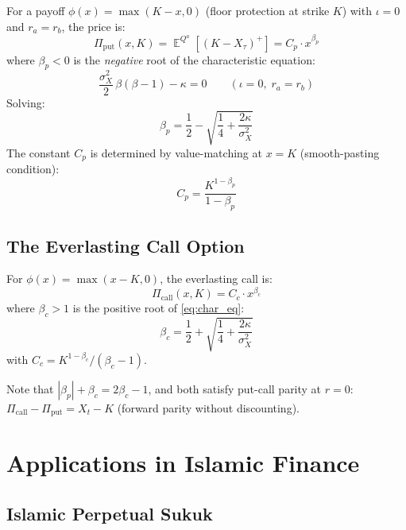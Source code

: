 \documentclass[10pt,twocolumn]{article}
\theoremstyle{plain}
\theoremstyle{definition}
\DeclareMathOperator{\E}{\mathbb{E}}
\newcommand{\Qa}{Q^a}
\begin{document}
For a payoff $\phi(x) = \max(K - x, 0)$ (floor protection at
strike $K$) with $\iota = 0$ and $r_a = r_b$, the price is:
\begin{equation}
\Pi_{\mathrm{put}}(x, K)
= \E^{\Qa}\!\left[(K - X_\tau)^+\right]
= C_p \cdot x^{\beta_p}
\label{eq:evput}
\end{equation}
where $\beta_p < 0$ is the \textit{negative} root of the
characteristic equation:
\begin{equation}
\frac{\sigma_X^2}{2}\,\beta(\beta-1) - \kappa = 0
\qquad (\iota = 0,\;r_a = r_b)
\label{eq:char_eq}
\end{equation}
Solving:
\begin{equation}
\beta_p = \frac{1}{2} - \sqrt{\frac{1}{4} + \frac{2\kappa}{\sigma_X^2}}
\label{eq:beta_p}
\end{equation}
The constant $C_p$ is determined by value-matching at $x = K$
(smooth-pasting condition):
\begin{equation}
C_p = \frac{K^{1-\beta_p}}{1 - \beta_p}
\label{eq:Cp}
\end{equation}

\subsection{The Everlasting Call Option}

For $\phi(x) = \max(x - K, 0)$, the everlasting call is:
\begin{equation}
\Pi_{\mathrm{call}}(x, K) = C_c \cdot x^{\beta_c}
\label{eq:evcall}
\end{equation}
where $\beta_c > 1$ is the positive root of \eqref{eq:char_eq}:
\begin{equation}
\beta_c = \frac{1}{2} + \sqrt{\frac{1}{4} + \frac{2\kappa}{\sigma_X^2}}
\label{eq:beta_c}
\end{equation}
with $C_c = K^{1-\beta_c}/(\beta_c - 1)$.

Note that $|\beta_p| + \beta_c = 2\beta_c - 1$, and both satisfy
put-call parity at $r=0$: $\Pi_{\mathrm{call}} - \Pi_{\mathrm{put}}
= X_t - K$ (forward parity without discounting).

\section{Applications in Islamic Finance}
\label{sec:applications}

\subsection{Islamic Perpetual Sukuk}
\label{sec:sukuk}
\end{document}
